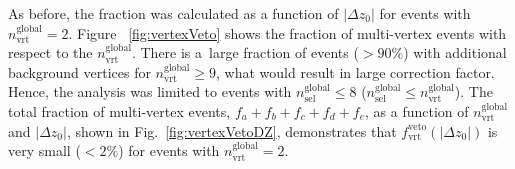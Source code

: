 As before, the fraction was calculated as a function of $|\Delta z_0|$ for events with $n^\textrm{global}_\textrm{vrt}=2$. Figure~ \ref{fig:vertexVeto} shows the fraction of multi-vertex events  with respect to the $n_\textrm{vrt}^\textrm{global}$. There is a~large fraction of events ($>90\%$) with additional background vertices for $n_\textrm{vrt}^\textrm{global}\geq 9$, what would result in large correction factor. Hence, the analysis was limited to events with $n_\textrm{sel}^\textrm{global}\leq8$ ($n_\textrm{sel}^\textrm{global}\leq n_\textrm{vrt}^\textrm{global}$). The total fraction of multi-vertex events, $f_a+f_b+f_c+f_d+f_e$, as a function of $n^\textrm{global}_\textrm{vrt}$ and $|\Delta z_0|$, shown in Fig.~\ref{fig:vertexVetoDZ}, demonstrates that $f_\textrm{vrt}^\textrm{veto}(|\Delta z_0|)$ is very small ($<2\%$) for events with $n^\textrm{global}_\textrm{vrt}=2$.







